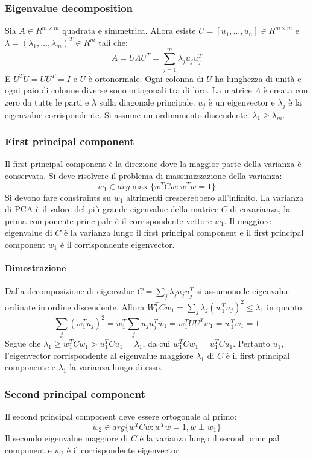 		\subsubsection{Eigenvalue decomposition}
		Sia $A\in R^{m\times m}$ quadrata e simmetrica.
		Allora esiste $U=[u_1,\dots,u_n]\in R^{m\times m}$ e $\lambda=(\lambda_1,\dots,\lambda_m)^T\in R^m$ tali che:
		$$A = U\Lambda U^T=\sum\limits_{j=1}^m\lambda_ju_ju_j^T$$
		E $U^TU=UU^T=I$ e $U$ \`e ortonormale.
		Ogni colonna di $U$ ha lunghezza di unit\`a e ogni paio di colonne diverse sono ortogonali tra di loro.
		La matrice $\Lambda$ \`e creata con zero da tutte le parti e $\lambda$ sulla diagonale principale.
		$u_j$ \`e un eigenvector e $\lambda_j$ \`e la eigenvalue corrispondente.
		Si assume un ordinamento discendente: $\lambda_1\ge \lambda_m$.
		
		\subsubsection{First principal component}
		Il first principal component \`e la direzione dove la maggior parte della varianza \`e conservata.
		Si deve risolvere il problema di massimizzazione della varianza:
		$$w_1\in arg\max\{w^TCw:w^Tw=1\}$$
		Si devono fare constraints su $w_1$ altrimenti crescerebbero all'infinito.
		La varianza di PCA \`e il valore del pi\`u grande eigenvalue della matrice $C$ di covarianza, la prima componente principale \`e il corrispondente vettore $w_1$.
		Il maggiore eigenvalue di $C$ \`e la varianza lungo il first principal component e il first principal component $w_1$ \`e il corrispondente eigenvector.
		
		\paragraph{Dimostrazione}
		Dalla decomposizione di eigenvalue $C=\sum\limits_j\lambda_ju_ju_j^T$ si assumono le eigenvalue ordinate in ordine discendente.
		Allora $W_1^TCw_1 = \sum\limits_j\lambda_j(w_1^Tu_j)^2\le\lambda_1$ in quanto:
		$$\sum\limits_j(w_1^Tu_j)^2 = w_1^T\sum\limits_ju_ju_j^Tw_1=w_1^TUU^Tw_1=w_1^Tw_1=1$$
		Segue che $\lambda_1\ge w_1^TCw_1 >u_1^TCu_1=\lambda_1$, da cui $w_1^TCw_1=u_1^TCu_1$.
		Pertanto $u_1$, l'eigenvector corrispondente al eigenvalue maggiore $\lambda_1$ di $C$ \`e il first principal componente e $\lambda_1$ la varianza lungo di esso.
		
		\subsubsection{Second principal component}
		Il second principal component deve essere ortogonale al primo:
		$$w_2\in arg\{w^TCw:w^Tw=1,w\perp w_1\}$$
		Il secondo eigenvalue maggiore di $C$ \`e la varianza lungo il second principal component e $w_2$ \`e il corrispondente eigenvector.
		
